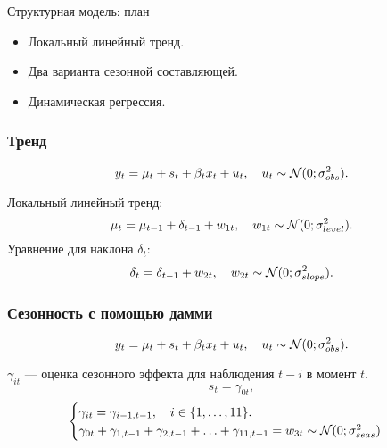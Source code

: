 
\begin{frame} %

    
    \end{frame}
    


    \begin{frame}{Структурная модель: план}
        \begin{itemize}[<+->]
          \item \alert{Локальный линейный} тренд. 
          \item Два варианта \alert{сезонной} составляющей.
          \item \alert{Динамическая регрессия}. 
        \end{itemize}
      
      \end{frame}
      
      

\begin{frame}
    \frametitle{Тренд}
    \[
    y_t = \mu_t + s_t + \beta_t x_t +  u_t, \quad u_t \sim \mathcal{N}(0; \sigma^2_{obs}).  
    \]
  
    \pause
    \alert{Локальный линейный тренд}:
    \[
       \mu_t = \mu_{t-1} + \delta_{t-1} + w_{1t}, \quad w_{1t} \sim \mathcal{N}(0; \sigma^2_{level}).
    \]
    \pause
    Уравнение для наклона $\delta_t$:
    \[
      \delta_{t} = \delta_{t-1} +  w_{2t}, \quad w_{2t} \sim \mathcal{N}(0; \sigma^2_{slope}).
    \]
    
  \end{frame}
  
  \begin{frame}
    \frametitle{Сезонность с помощью дамми}
    \[
    y_t = \mu_t + s_t + \beta_t x_t +  u_t, \quad u_t \sim \mathcal{N}(0; \sigma^2_{obs}).  
    \]
  
    \pause
    $\gamma_{it}$ — оценка сезонного эффекта для наблюдения $t-i$ в момент $t$. 
    \[
    s_t = \gamma_{0t},  
    \]
    \pause
    \[
      \begin{cases}
      \gamma_{it} = \gamma_{i-1,t-1}, \quad i \in \{1, \ldots, 11\}.  \\
      \gamma_{0t} + \gamma_{1,t-1} + \gamma_{2,t-1} + \ldots + \gamma_{11,t-1} = w_{3t} \sim \mathcal{N}(0;\sigma^2_{seas})
      \end{cases}
    \]
  \end{frame}
  

